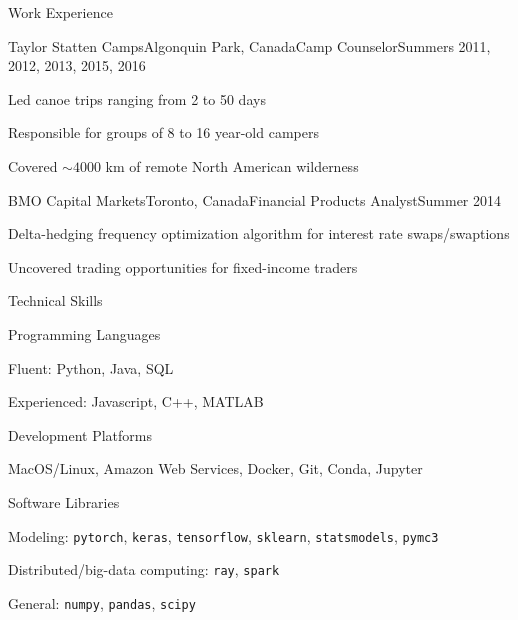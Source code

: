 \documentclass{resume} %
\begin{document}
\begin{rSection}{Work Experience}
\begin{rSubsection}{Taylor Statten Camps}{Algonquin Park, Canada}{Camp Counselor}{Summers 2011, 2012, 2013, 2015, 2016}
	\item Led canoe trips ranging from 2 to 50 days
	\item Responsible for groups of 8 to 16 year-old campers
	\item Covered ${\sim}4000$ km of remote North American wilderness
\end{rSubsection}
\begin{rSubsection}{BMO Capital Markets}{Toronto, Canada}{Financial Products Analyst}{Summer 2014}
	\item Delta-hedging frequency optimization algorithm for interest rate swaps/swaptions
	\item Uncovered trading opportunities for fixed-income traders
\end{rSubsection}

\end{rSection}


\begin{rSection}{Technical Skills}

\begin{rSubsection}{Programming Languages}{}{}{}
	\item Fluent: Python, Java, SQL
	\item Experienced: Javascript, C++, MATLAB
\end{rSubsection}
\begin{rSubsection}{Development Platforms}{}{}{}
	\item MacOS/Linux, Amazon Web Services, Docker, Git, Conda, Jupyter
\end{rSubsection}
\begin{rSubsection}{Software Libraries}{}{}{}
	\item Modeling: \texttt{pytorch}, \texttt{keras}, \texttt{tensorflow}, \texttt{sklearn}, \texttt{statsmodels}, \texttt{pymc3}
	\item Distributed/big-data computing: \texttt{ray}, \texttt{spark}
	\item General: \texttt{numpy}, \texttt{pandas}, \texttt{scipy}
\end{rSubsection}

\end{rSection}
\end{document}
